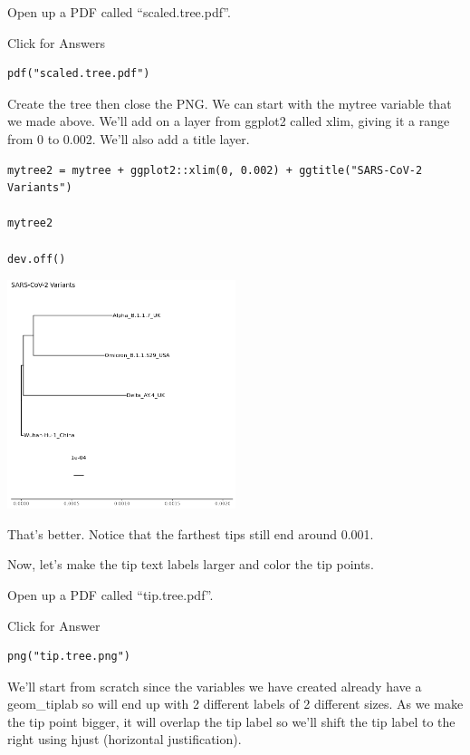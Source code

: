\documentclass[
]{book}
\begin{document}
Open up a PDF called ``scaled.tree.pdf''.

Click for Answers

\begin{verbatim}
pdf("scaled.tree.pdf")
\end{verbatim}

\hfill\break

Create the tree then close the PNG. We can start with the mytree variable that we made above. We'll add on a layer from ggplot2 called xlim, giving it a range from 0 to 0.002. We'll also add a title layer.

\begin{verbatim}
mytree2 = mytree + ggplot2::xlim(0, 0.002) + ggtitle("SARS-CoV-2 Variants")

mytree2

dev.off()
\end{verbatim}

\includegraphics[width=0.5\textwidth,height=\textheight]{./Figures/scaled.tree.png}

That's better. Notice that the farthest tips still end around 0.001.

Now, let's make the tip text labels larger and color the tip points.

Open up a PDF called ``tip.tree.pdf''.

Click for Answer

\begin{verbatim}
png("tip.tree.png")
\end{verbatim}

\hfill\break

We'll start from scratch since the variables we have created already have a geom\_tiplab so will end up with 2 different labels of 2 different sizes. As we make the tip point bigger, it will overlap the tip label so we'll shift the tip label to the right using hjust (horizontal justification).
\end{document}
